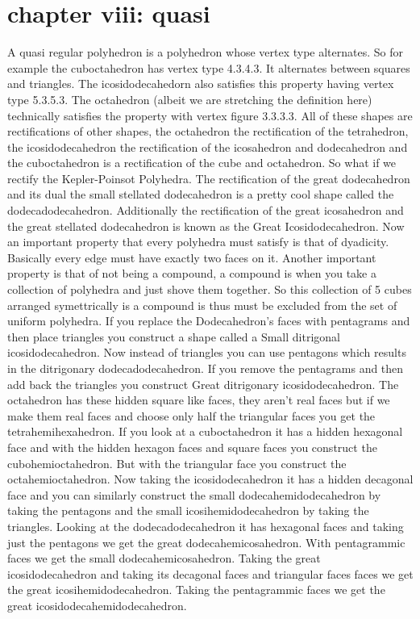 \documentclass{article}
\begin{document}
\section*{chapter viii: quasi}
A quasi regular polyhedron is a polyhedron whose vertex type alternates. So for example the cuboctahedron has vertex type 4.3.4.3. It alternates between squares and triangles. The icosidodecahedorn also satisfies this property having vertex type 5.3.5.3. The octahedron (albeit we are stretching the definition here) technically satisfies the property with vertex figure 3.3.3.3. All of these shapes are rectifications of other shapes, the octahedron the rectification of the tetrahedron, the icosidodecahedron the rectification of the icosahedron and dodecahedron and the cuboctahedron is a rectification of the cube and octahedron. So what if we rectify the Kepler-Poinsot Polyhedra. The rectification of the great dodecahedron and its dual the small stellated dodecahedron is a pretty cool shape called the dodecadodecahedron. Additionally the rectification of the great icosahedron and the great stellated dodecahedron is known as the Great Icosidodecahedron. Now an important property that every polyhedra must satisfy is that of dyadicity. Basically every edge must have exactly two faces on it. Another important property is that of not being a compound, a compound is when you take a collection of polyhedra and just shove them together. So this collection of 5 cubes arranged symettrically is a compound is thus must be excluded from the set of uniform polyhedra. If you replace the Dodecahedron's faces with pentagrams and then place triangles you construct a shape called a Small ditrigonal icosidodecahedron. Now instead of triangles you can use pentagons which results in the ditrigonary dodecadodecahedron. If you remove the pentagrams and then add back the triangles you construct Great ditrigonary icosidodecahedron. The octahedron has these hidden square like faces, they aren't real faces but if we make them real faces and choose only half the triangular faces you get the tetrahemihexahedron. If you look at a cuboctahedron it has a hidden hexagonal face and with the hidden hexagon faces and square faces you construct the cubohemioctahedron. But with the triangular face you construct the octahemioctahedron. Now taking the icosidodecahedron it has a hidden decagonal face and you can similarly construct the small dodecahemidodecahedron by taking the pentagons and the small icosihemidodecahedron by taking the triangles. Looking at the dodecadodecahedron it has hexagonal faces and taking just the pentagons we get the great dodecahemicosahedron. With pentagrammic faces we get the small dodecahemicosahedron. Taking the great icosidodecahedron and taking its decagonal faces and triangular faces faces we get the great icosihemidodecahedron. Taking the pentagrammic faces we get the great icosidodecahemidodecahedron.
\end{document}
